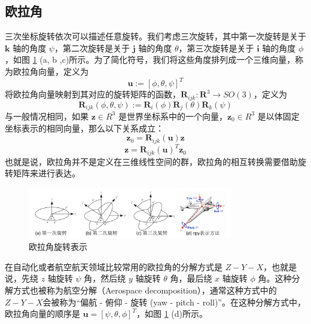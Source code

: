 \subsection{欧拉角}
三次坐标旋转依次可以描述任意旋转。我们考虑三次旋转，其中第一次旋转是关于 $\boldsymbol{k}$ 轴的角度 $\psi$，第二次旋转是关于 $\boldsymbol{j}$ 轴的角度 $\theta$，第三次旋转是关于 $\boldsymbol{i}$ 轴的角度 $\phi$，如图 \ref{fig:rotation} (a, b ,c)所示。为了简化符号，我们将这些角度排列成一个三维向量，称为欧拉角向量，定义为 
\begin{equation}
    \boldsymbol{u} := [\phi, \theta, \psi]^T
\end{equation}
将欧拉角向量映射到其对应的旋转矩阵的函数，$\boldsymbol{R}_{ijk} : \boldsymbol{R}^3 \to SO(3)$，定义为
\begin{equation}
    \boldsymbol{R}_{ijk}(\phi, \theta, \psi) := \boldsymbol{R}_i(\phi)\boldsymbol{R}_j(\theta)\boldsymbol{R}_k(\psi)
\end{equation}
与一般情况相同，如果 $\boldsymbol{z} \in R^3$ 是世界坐标系中的一个向量，$\boldsymbol{z}_0 \in R^3$ 是以体固定坐标表示的相同向量，那么以下关系成立：
\begin{equation}
    \boldsymbol{z}_0 = \boldsymbol{R}_{ijk}(\boldsymbol{u}) \boldsymbol{z}
\end{equation}
\begin{equation}
    \boldsymbol{z} = \boldsymbol{R}_{ijk}(\boldsymbol{u})^T \boldsymbol{z}_0
\end{equation}
也就是说，欧拉角并不是定义在三维线性空间的群，欧拉角的相互转换需要借助旋转矩阵来进行表达。

\begin{figure}
    \centering
    \includegraphics[width=0.8\textwidth]{images/rotation.pdf}
    \caption{欧拉角旋转表示}
    \label{fig:rotation}
\end{figure}

在自动化或者航空航天领域比较常用的欧拉角的分解方式是 $Z-Y-X$，也就是说，先绕 $z$ 轴旋转 $\psi$ 角，然后绕 $y$ 轴旋转 $\theta$ 角，最后绕 $x$ 轴旋转 $\phi$ 角。这种分解方式也被称为航空分解（Aerospace decomposition），通常这种方式中的$Z-Y-X$会被称为“偏航 - 俯仰 - 旋转 (yaw - pitch - roll)”。在这种分解方式中，欧拉角向量的顺序是 $\boldsymbol{u} = [\psi, \theta, \phi]^T$，如图 \ref{fig:rotation} (d)所示。

